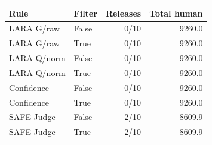 \begin{tabular}{@{}llrr@{}}
\toprule
Rule & Filter & Releases & Total human \\
\midrule
LARA G/raw & False & 0/10 & 9260.0 \\
LARA G/raw & True & 0/10 & 9260.0 \\
LARA Q/norm & False & 0/10 & 9260.0 \\
LARA Q/norm & True & 0/10 & 9260.0 \\
Confidence & False & 0/10 & 9260.0 \\
Confidence & True & 0/10 & 9260.0 \\
SAFE-Judge & False & 2/10 & 8609.9 \\
SAFE-Judge & True & 2/10 & 8609.9 \\
\bottomrule
\end{tabular}
